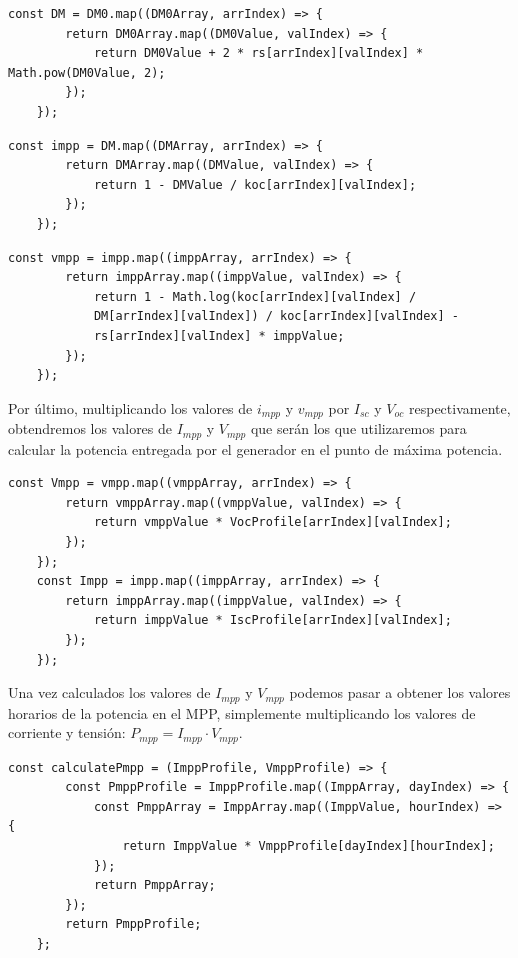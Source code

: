 \begin{lstlisting}[style=ES6, caption={Cálculo de $D_{M}$}]
	const DM = DM0.map((DM0Array, arrIndex) => {
		return DM0Array.map((DM0Value, valIndex) => {
			return DM0Value + 2 * rs[arrIndex][valIndex] * Math.pow(DM0Value, 2);
		});
	});
\end{lstlisting} 

\begin{lstlisting}[style=ES6, caption={Cálculo de $i_{mpp}$}]
	const impp = DM.map((DMArray, arrIndex) => {
		return DMArray.map((DMValue, valIndex) => {
			return 1 - DMValue / koc[arrIndex][valIndex];
		});
	});
\end{lstlisting} 

\begin{lstlisting}[style=ES6, caption={Cálculo de $v_{mpp}$}]
	const vmpp = impp.map((imppArray, arrIndex) => {
		return imppArray.map((imppValue, valIndex) => {
			return 1 - Math.log(koc[arrIndex][valIndex] / 
			DM[arrIndex][valIndex]) / koc[arrIndex][valIndex] - 
			rs[arrIndex][valIndex] * imppValue;
		});
	});
\end{lstlisting} 

Por último, multiplicando los valores de $i_{mpp}$ y $v_{mpp}$ por $I_{sc}$ y $V_{oc}$ respectivamente, obtendremos los valores de $I_{mpp}$ y $V_{mpp}$ que serán los que utilizaremos para calcular la potencia entregada por el generador en el punto de máxima potencia.

\begin{lstlisting}[style=ES6, caption={Cálculo de $V_{mpp}$ y $I_{mpp}$}]
	const Vmpp = vmpp.map((vmppArray, arrIndex) => {
		return vmppArray.map((vmppValue, valIndex) => {
			return vmppValue * VocProfile[arrIndex][valIndex];
		});
	});
	const Impp = impp.map((imppArray, arrIndex) => {
		return imppArray.map((imppValue, valIndex) => {
			return imppValue * IscProfile[arrIndex][valIndex];
		});
	});

\end{lstlisting} 

Una vez calculados los valores de $I_{mpp}$ y $V_{mpp}$ podemos pasar a obtener los valores horarios de la potencia en el MPP, simplemente multiplicando los valores de corriente y tensión: $P_{mpp} = I_{mpp} \cdot V_{mpp}$.
\newpage

\begin{lstlisting}[style=ES6, caption={Cálculo de $P_{mpp}$}]
	const calculatePmpp = (ImppProfile, VmppProfile) => {
		const PmppProfile = ImppProfile.map((ImppArray, dayIndex) => {
			const PmppArray = ImppArray.map((ImppValue, hourIndex) => {
				return ImppValue * VmppProfile[dayIndex][hourIndex];
			});
			return PmppArray;
		});
		return PmppProfile;
	};

\end{lstlisting} 

